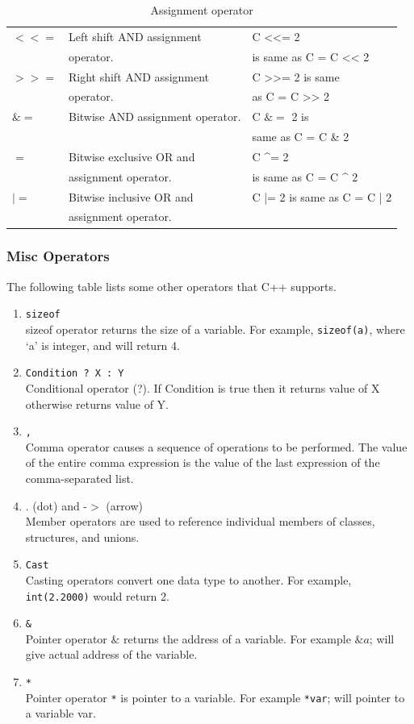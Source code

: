 \documentclass{book}
\begin{document}
\begin{table}[h]
\begin{tabular}{lll}
$<<=$ & 	Left shift AND assignment 	& C <<= 2  \\
& operator. &  is same as C = C << 2 \\
$>>=$ & Right shift AND assignment & C >>= 2 is same  \\
& operator. & as C = C >> 2 \\
$\&=$ &	Bitwise AND assignment operator.	& C $\&=$ 2 is \\
& & same as C = C \& 2 \\
$\hat{}=$	& Bitwise exclusive OR and & 	C ^= 2  \\
& assignment operator. & is same as C = C ^ 2 \\
$|=$	& Bitwise inclusive OR and & C |= 2 is same as C = C | 2 \\
& assignment operator. & \\ \hline 
\end{tabular}
\caption{Assignment operator}
\label{assignop}
\end{table}

\subsubsection{Misc Operators}

The following table lists some other operators that C++ supports.

\begin{enumerate}
	\item \texttt{sizeof} \\
sizeof operator returns the size of a variable. For example, \texttt{sizeof(a)}, where ‘a’ is integer, and will return 4.

\item \texttt{Condition ? X : Y} \\
Conditional operator (?). If Condition is true then it returns value of X otherwise returns value of Y.

\item \texttt{,} \\
Comma operator causes a sequence of operations to be performed. The value of the entire comma expression is the value of the last expression of the comma-separated list.

\item . (dot) and -$>$ (arrow) \\
Member operators are used to reference individual members of classes, structures, and unions.

\item \texttt{Cast} \\
Casting operators convert one data type to another. For example, \texttt{int(2.2000)} would return 2.

\item \texttt{\&} \\
Pointer operator $\&$ returns the address of a variable. For example $\&a$; will give actual address of the variable.

\item \texttt{*} \\
Pointer operator \texttt{*} is pointer to a variable. For example \texttt{*var}; will pointer to a variable var.
\end{enumerate}
\end{document}
